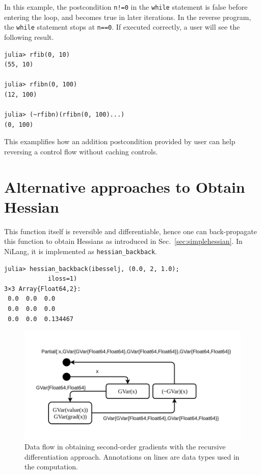 \documentclass[aps,twocolumn,longbibliography,english,superscriptaddress]{revtex4-1}
\newcommand{\<}{\langle}
\renewcommand{\>}{\rangle}
\newcommand{\Sec}[1]{Sec.~\ref{#1}}
\theoremstyle{definition}\newtheorem{definition}{\textit{Definition}}
\begin{document}
In this example, the postcondition \texttt{n!=0} in the \texttt{while} statement is false before entering the loop, and becomes true in later iterations. In the reverse program, the \texttt{while} statement stops at \texttt{n==0}.
If executed correctly, a user will see the following result.

\begin{minipage}{.44\textwidth}
\begin{lstlisting}
julia> rfib(0, 10)
(55, 10)

julia> rfibn(0, 100)
(12, 100)

julia> (~rfibn)(rfibn(0, 100)...)
(0, 100)
\end{lstlisting}
\end{minipage}

This examplifies how an addition postcondition provided by user can help reversing a control flow without caching controls.

\section{Alternative approaches to Obtain Hessian}\label{app:hessian}
This function itself is reversible and differentiable, hence one can back-propagate this function to obtain Hessians as introduced in \Sec{sec:simplehessian}. In NiLang, it is implemented as \texttt{hessian\_backback}.

\begin{minipage}{.44\textwidth}
\begin{lstlisting}
julia> hessian_backback(ibesselj, (0.0, 2, 1.0);
            iloss=1)
3×3 Array{Float64,2}:
 0.0  0.0  0.0     
 0.0  0.0  0.0     
 0.0  0.0  0.134467
\end{lstlisting}
\end{minipage}

\begin{figure}[h]
    \centerline{\includegraphics[width=\columnwidth,trim={0 1cm 0cm 1cm},clip]{images/simplehessian.pdf}}
    \caption{Data flow in obtaining second-order gradients with the recursive differentiation approach. Annotations on lines are data types used in the computation.}\label{fig:simplehessian}
\end{figure}
\end{document}
